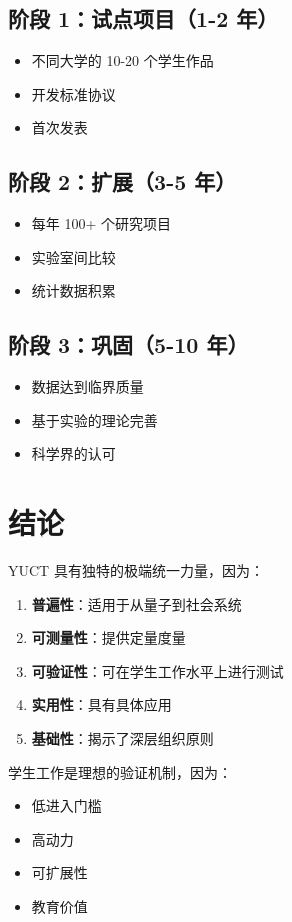 \documentclass[12pt,a4paper]{article}
\begin{document}
	\subsection{阶段 1：试点项目（1-2 年）}
	\begin{itemize}
		\item 不同大学的 10-20 个学生作品
		\item 开发标准协议
		\item 首次发表
	\end{itemize}
	
	\subsection{阶段 2：扩展（3-5 年）}
	\begin{itemize}
		\item 每年 100+ 个研究项目
		\item 实验室间比较
		\item 统计数据积累
	\end{itemize}
	
	\subsection{阶段 3：巩固（5-10 年）}
	\begin{itemize}
		\item 数据达到临界质量
		\item 基于实验的理论完善
		\item 科学界的认可
	\end{itemize}
	
	\section{结论}
	
	YUCT 具有独特的极端统一力量，因为：
	\begin{enumerate}
		\item \textbf{普遍性}：适用于从量子到社会系统
		\item \textbf{可测量性}：提供定量度量
		\item \textbf{可验证性}：可在学生工作水平上进行测试
		\item \textbf{实用性}：具有具体应用
		\item \textbf{基础性}：揭示了深层组织原则
	\end{enumerate}
	
	学生工作是理想的验证机制，因为：
	\begin{itemize}
		\item 低进入门槛
		\item 高动力
		\item 可扩展性
		\item 教育价值
	\end{itemize}
	
\end{document}

